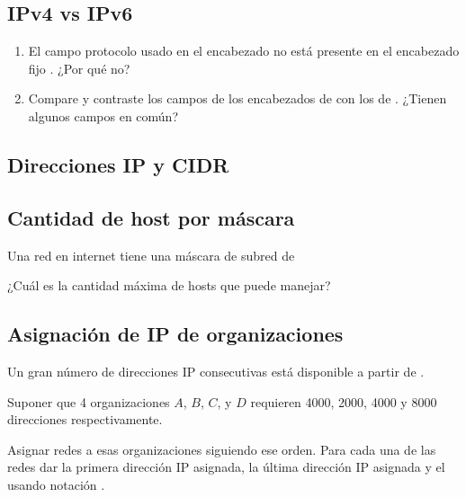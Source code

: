\documentclass[12pt]{report}
\begin{document}
\begin{exer}
	\subsection{IPv4 vs IPv6 \stwo \steo}
	\begin{enumerate}
		\item El campo protocolo usado en el encabezado  no está presente en el encabezado fijo . ¿Por qué no?
		\item Compare y contraste los campos de los encabezados de  con los de . ¿Tienen
		      algunos campos en común?
	\end{enumerate}

\end{exer}

\begin{exer}
	\section{Direcciones IP y CIDR}
	\subsection{Cantidad de host por máscara \sthree}
	Una red en internet tiene una máscara de subred de 

	¿Cuál es la cantidad máxima de hosts que puede manejar?
\end{exer}

\begin{exer}
	\subsection{Asignación de IP de organizaciones \sfour \shard}
	Un gran número de direcciones IP consecutivas está disponible a partir de
	.

	Suponer que 4 organizaciones $A$, $B$, $C$, y $D$ requieren 4000, 2000, 4000 y 8000
	direcciones respectivamente.

	Asignar redes a esas organizaciones siguiendo ese orden.
	Para cada una de las redes dar la primera dirección IP asignada, la última dirección IP asignada y el  usando notación .
\end{exer}
\end{document}
